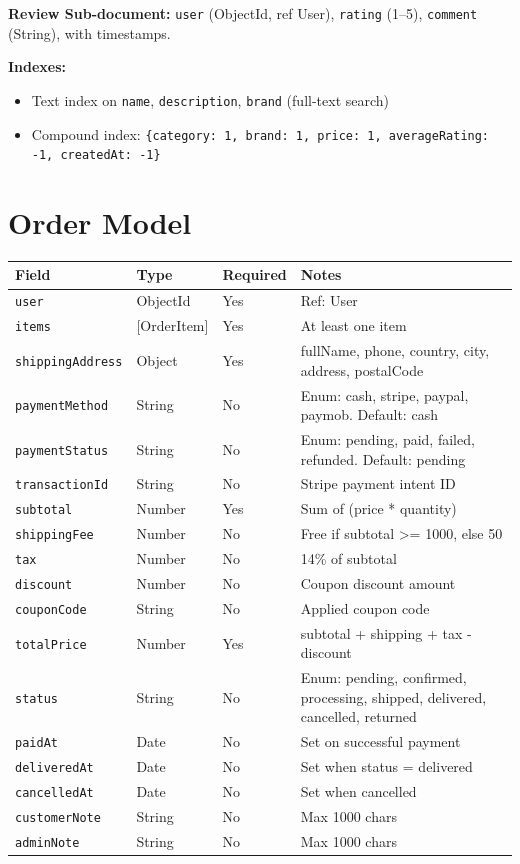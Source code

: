 \textbf{Review Sub-document:} \texttt{user} (ObjectId, ref User), \texttt{rating} (1--5), \texttt{comment} (String), with timestamps.

\textbf{Indexes:}
\begin{itemize}
  \item Text index on \texttt{name}, \texttt{description}, \texttt{brand} (full-text search)
  \item Compound index: \texttt{\{category: 1, brand: 1, price: 1, averageRating: -1, createdAt: -1\}}
\end{itemize}

\section{Order Model}

\begin{longtable}{@{}p{3.5cm}p{3cm}p{2cm}p{5.5cm}@{}}
  \toprule
  \textbf{Field} & \textbf{Type} & \textbf{Required} & \textbf{Notes} \\
  \midrule
  \texttt{user}            & ObjectId & Yes & Ref: User \\
  \texttt{items}           & [OrderItem] & Yes & At least one item \\
  \texttt{shippingAddress} & Object   & Yes & fullName, phone, country, city, address, postalCode \\
  \texttt{paymentMethod}   & String   & No  & Enum: cash, stripe, paypal, paymob. Default: cash \\
  \texttt{paymentStatus}   & String   & No  & Enum: pending, paid, failed, refunded. Default: pending \\
  \texttt{transactionId}   & String   & No  & Stripe payment intent ID \\
  \texttt{subtotal}        & Number   & Yes & Sum of (price * quantity) \\
  \texttt{shippingFee}     & Number   & No  & Free if subtotal >= 1000, else 50 \\
  \texttt{tax}             & Number   & No  & 14\% of subtotal \\
  \texttt{discount}        & Number   & No  & Coupon discount amount \\
  \texttt{couponCode}      & String   & No  & Applied coupon code \\
  \texttt{totalPrice}      & Number   & Yes & subtotal + shipping + tax - discount \\
  \texttt{status}          & String   & No  & Enum: pending, confirmed, processing, shipped, delivered, cancelled, returned \\
  \texttt{paidAt}          & Date     & No  & Set on successful payment \\
  \texttt{deliveredAt}     & Date     & No  & Set when status = delivered \\
  \texttt{cancelledAt}     & Date     & No  & Set when cancelled \\
  \texttt{customerNote}    & String   & No  & Max 1000 chars \\
  \texttt{adminNote}       & String   & No  & Max 1000 chars \\
  \bottomrule
\end{longtable}

